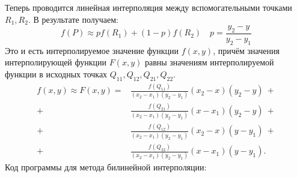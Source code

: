 Теперь проводится линейная интерполяция между вспомогательными точками $R_1, R_2$. В результате получаем:
\begin{equation*}
	f(P)\approx pf(R_1) + (1-p)f(R_2)\quad p=\frac{y_2-y}{y_2-y_1}
\end{equation*}
Это и есть интерполируемое значение функции $f(x,y)$, причём значения интерполирующей функции $F(x,y)$ равны значениям интерполируемой функции в исходных точках $Q_{11}, Q_{12}, Q_{21}, Q_{22}$.
\begin{align*}
	f(x,y) \approx F(x, y) = & \frac{f(Q_{11})}{(x_2-x_1)(y_2-y_1)} (x_2-x)(y_2-y)\ + \\
	+                        & \frac{f(Q_{21})}{(x_2-x_1)(y_2-y_1)} (x-x_1)(y_2-y)\ + \\
	+                        & \frac{f(Q_{12})}{(x_2-x_1)(y_2-y_1)} (x_2-x)(y-y_1)\ + \\
	+                        & \frac{f(Q_{22})}{(x_2-x_1)(y_2-y_1)} (x-x_1)(y-y_1).
\end{align*}
Код программы для метода билинейной интерполяции:
